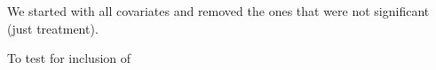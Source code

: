 \documentclass[11pt,a4paper]{article}
\begin{document}
We started with all covariates and removed the ones that were not significant (just treatment).

To test for inclusion of 












\cleardoublepage{}
{}
%
%
%
%



%
%
\end{document}
